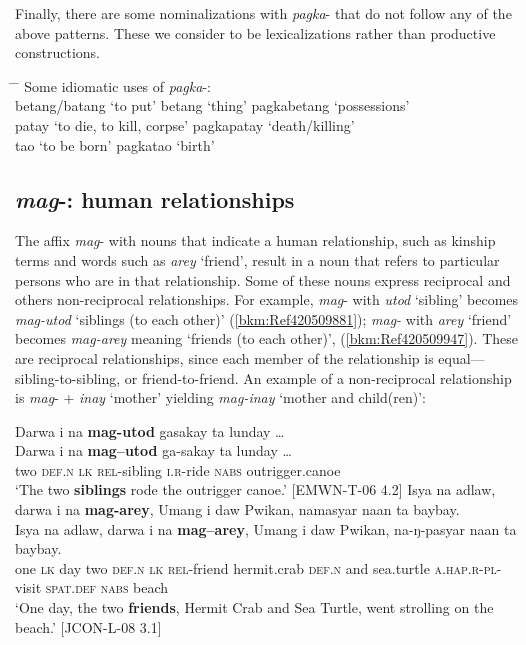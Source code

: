 Finally, there are some nominalizations with \textit{pagka}{}- that do not follow any of the above patterns. These we consider to be lexicalizations rather than productive constructions.

\ea
\begin{tabbing}
\hspace{4cm} \= \hspace{3cm} \= \kill
Some idiomatic uses of \textit{pagka}{}-: \\ 
betang/batang ‘to put’ \> betang ‘thing’ \> pagkabetang ‘possessions’ \\
patay ‘to die, to kill, corpse’ \> \>   pagkapatay ‘death/killing’ \\
tao ‘to be born’ \> \>  pagkatao ‘birth’
\end{tabbing}
\z
\subsection{\textit{mag}-: human relationships}
\label{sec:mag}

The affix \textit{mag}{}- with nouns that indicate a human relationship, such as kinship terms and words such as \textit{arey} ‘friend’, result in a noun that refers to particular persons who are in that relationship. Some of these nouns express reciprocal and others non-reciprocal relationships. For example, \textit{mag}{}- with \textit{utod} ‘sibling’ becomes \textit{mag-utod} ‘siblings (to each other)’ (\ref{bkm:Ref420509881}); \textit{mag-} with \textit{arey} ‘friend’ becomes \textit{mag-arey} meaning ‘friends (to each other)’, (\ref{bkm:Ref420509947}). These are reciprocal relationships, since each member of the relationship is equal---sibling-to-sibling, or friend-to-friend. An example of a non-reciprocal relationship is \textit{mag}{}- + \textit{inay} ‘mother’ yielding \textit{mag-inay} ‘mother and child(ren)’:

\ea
\label{bkm:Ref420509881}
Darwa  i  na  \textbf{mag-utod}  gasakay  ta  lunday … \\\smallskip
 \gll Darwa  i  na  \textbf{mag--utod}  ga-sakay  ta  lunday … \\
two  \textsc{def.n}  \textsc{lk}  \textsc{rel}-sibling  \textsc{i.r-}ride  \textsc{nabs}  outrigger.canoe \\
\glt ‘The two \textbf{siblings} rode the outrigger canoe.’ [EMWN-T-06 4.2]
\z
\ea
\label{bkm:Ref420509947}
Isya  na  adlaw,  darwa  i  na  \textbf{mag-arey},  Umang  i daw Pwikan,  namasyar  naan  ta  baybay. \\\smallskip
 \gll Isya  na  adlaw,  darwa  i  na  \textbf{mag--arey},  Umang  i daw Pwikan,  na-ŋ-pasyar  naan  ta  baybay. \\
one  \textsc{lk}  day  two  \textsc{def.n}  \textsc{lk}  \textsc{rel}-friend  hermit.crab  \textsc{def.n} and sea.turtle  \textsc{a.hap.r}-\textsc{pl}-visit  \textsc{spat.def}  \textsc{nabs}  beach \\
\glt `One day, the two \textbf{friends}, Hermit Crab and Sea Turtle, went strolling on the beach.’ [JCON-L-08 3.1]
\z

